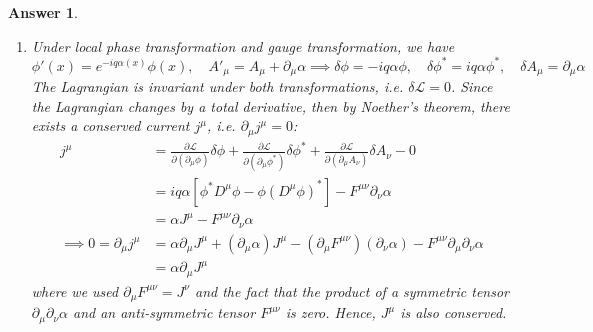 \documentclass[a4paper]{article}
\newtheorem{ans}{Answer}[section]
\theoremstyle{new}
\begin{document}
\begin{ans}
\begin{enumerate}[label=(\alph*)]
so we have
$$0=\frac{\partial\mathcal{L}}{\partial A_\nu}-\partial_\mu\frac{\partial\mathcal{L}}{\partial(\partial_\mu A_\nu)}=-iq(\phi^*\partial^\nu\phi-\phi\partial^\nu\phi^*)+2q^2A^\nu\phi^*\phi+\partial_\mu F^{\mu\nu}$$
but the current is
\begin{align}
    J^\nu&=iq[\phi^*D^\nu\phi-\phi(D^\nu\phi)^*]\nonumber\\&=iq[\phi^*(\partial^\nu\phi+iqA^\nu\phi)-\phi(\partial^\nu\phi^*-iqA^\nu\phi^*)]\nonumber\\&=iq(\phi^*\partial^\nu\phi-\phi\partial^\nu\phi^*)-2q^2A^\nu\phi^*\phi\nonumber\\&=\partial_\mu F^{\mu\nu}\nonumber
\end{align}
where the result follows from the equation of motion.
\item Under local phase transformation and gauge transformation, we have
$$\phi'(x)=e^{-iq\alpha(x)}\phi(x),\quad A'_\mu=A_\mu+\partial_\mu\alpha\implies\delta\phi=-iq\alpha\phi,\quad\delta\phi^*=iq\alpha\phi^*,\quad\delta A_\mu=\partial_\mu\alpha$$
The Lagrangian is invariant under both transformations, i.e. $\delta\mathcal{L}=0$. Since the Lagrangian changes by a total derivative, then by Noether's theorem, there exists a conserved current $j^\mu$, i.e. $\partial_\mu j^\mu=0$:
\begin{align}
    j^\mu&=\frac{\partial\mathcal{L}}{\partial(\partial_\mu\phi)}\delta\phi+\frac{\partial\mathcal{L}}{\partial(\partial_\mu\phi^*)}\delta\phi^*+\frac{\partial\mathcal{L}}{\partial(\partial_\mu A_\nu)}\delta A_\nu-0\nonumber\\&=iq\alpha[\phi^*D^\mu\phi-\phi(D^\mu\phi)^*]-F^{\mu\nu}\partial_\nu\alpha\nonumber\\&=\alpha J^\mu-F^{\mu\nu}\partial_\nu\alpha\nonumber\\\implies 0=\partial_\mu j^\mu&=\alpha\partial_\mu J^\mu+(\partial_\mu\alpha)J^\mu-(\partial_\mu F^{\mu\nu})(\partial_\nu\alpha)-F^{\mu\nu}\partial_\mu\partial_\nu\alpha\nonumber\\&=\alpha\partial_\mu J^\mu\nonumber
\end{align}
where we used $\partial_\mu F^{\mu\nu}=J^\nu$ and the fact that the product of a symmetric tensor $\partial_\mu\partial_\nu\alpha$ and an anti-symmetric tensor $F^{\mu\nu}$ is zero. Hence, $J^\mu$ is also conserved.
\end{enumerate}
\end{ans}
\end{document}
